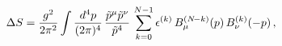 \begin{equation}
\Delta S ={g^2 \over 2 \pi^2} \int {d^4 p \over (2 \pi)^4} 
\, {{\tilde p}^\mu {\tilde p}^\nu \over
{\tilde p}^4 } \, \sum_{k=0}^{N-1} \epsilon^{(k)} \, B_\mu^{(N\!-k)}(p) 
\, B_\nu^{(k)}(-p) \, ,
\label{action}
\end{equation}

